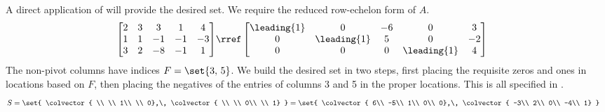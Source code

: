 A direct application of  will provide the desired set.  We require the reduced row-echelon form of $A$.
%
\begin{align*}
\begin{bmatrix}
2 & 3 & 3 & 1 & 4 \\
1 & 1 & -1 & -1 & -3 \\
3 & 2 & -8 & -1 & 1
\end{bmatrix}
&\rref
\begin{bmatrix}
\leading{1} & 0 & -6 & 0 & 3 \\
0 & \leading{1} & 5 & 0 & -2 \\
0 & 0 & 0 & \leading{1} & 4\end{bmatrix}
\end{align*}
%
The non-pivot columns have indices $F=\set{3,\,5}$.  We build the desired set in two steps, first placing the requisite zeros and ones in locations based on $F$, then placing the negatives of the entries of columns 3 and 5 in the proper locations.  This is all specified in .
%
\begin{align*}
S&=
\set{
\colvector{ \\ \\ 1\\ \\ 0},\,
\colvector{ \\ \\ 0\\ \\ 1}
}
=
\set{
\colvector{ 6\\ -5\\ 1\\ 0\\ 0},\,
\colvector{ -3\\ 2\\ 0\\ -4\\ 1}
}
\end{align*}
